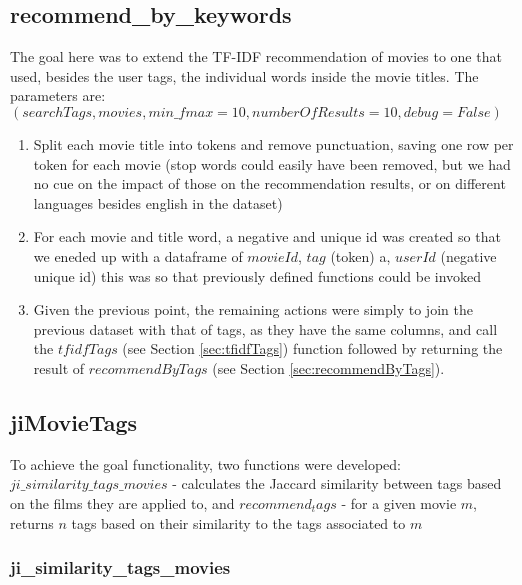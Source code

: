 \documentclass[10pt,twocolumn]{article}
\begin{document}
\subsection{recommend\_by\_keywords}
The goal here was to extend the TF-IDF recommendation of movies to one that used, besides the user tags, the individual words inside the movie titles. The parameters are: $(searchTags, movies, min\_fmax=10, numberOfResults=10, debug=False)$
\begin{enumerate}
    \itemsep0em
    \item Split each movie title into tokens and remove punctuation, saving one row per token for each movie (stop words could easily have been removed, but we had no cue on the impact of those on the recommendation results, or on different languages besides english in the dataset)
    \item For each movie and title word, a negative and unique id was created so that we eneded up with a dataframe of $movieId$, $tag$ (token) a, $userId$ (negative unique id) this was so that previously defined functions could be invoked
    \item Given the previous point, the remaining actions were simply to join the previous dataset with that of tags, as they have the same columns, and call the $tfidfTags$ (see Section \ref{sec:tfidfTags}) function followed by returning the result of $recommendByTags$ (see Section \ref{sec:recommendByTags}).
\end{enumerate}
\subsection{jiMovieTags}

To achieve the goal functionality, two functions were developed: $ji\_similarity\_tags\_movies$ - calculates the Jaccard similarity between tags based on the films they are applied to, and $recommend_tags$ - for a given movie $m$, returns $n$ tags based on their similarity to the tags associated to $m$

\subsubsection{ji\_similarity\_tags\_movies}
\end{document}
